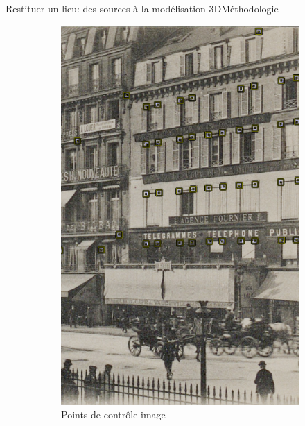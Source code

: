 \documentclass[8pt]{beamer}
\begin{document}
\begin{frame}{Restituer un lieu: des sources à la modélisation 3D}{Méthodologie}
	\begin{figure}
		\begin{subfigure}{0.25\textwidth}
			\includegraphics[width=\textwidth]{includes/c_slide9_0.png}
			\caption{Points de contrôle image}
		\end{subfigure}
		\begin{subfigure}{0.23\textwidth}

\end{subfigure}
\end{figure}
\end{frame}
\end{document}
